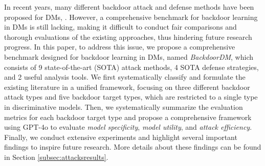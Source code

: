 In recent years, many different backdoor attack and defense methods have been proposed for DMs, \eg \cite{zhai2023text,chou2023backdoor}.
However, a comprehensive benchmark for backdoor learning in DMs is still lacking, making it difficult to conduct fair comparisons and thorough evaluations of the existing approaches, thus hindering future research progress. 
In this paper, to address this issue, we propose a comprehensive benchmark designed for backdoor learning in DMs, named \textit{BackdoorDM}, which consists of 9 state-of-the-art (SOTA) attack methods, 4 SOTA defense strategies, and 2 useful analysis tools. 
We first systematically classify and formulate the existing literature in a unified framework, focusing on three different backdoor attack types and five backdoor target types, which are restricted to a single type in discriminative models. 
Then, we systematically summarize the evaluation metrics for each backdoor target type and propose a comprehensive framework using GPT-4o to evaluate \textit{model specificity}, \textit{model utility}, and \textit{attack efficiency}.  
Finally, we conduct extensive experiments and highlight several important findings to inspire future research. 
More details about these findings can be found in Section \ref{subsec:attacksresults}. 


